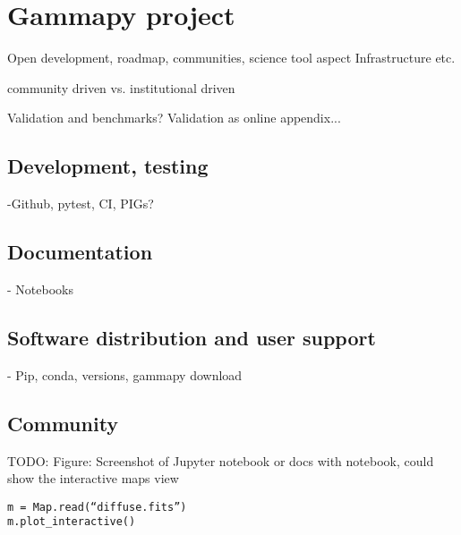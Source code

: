 \section{Gammapy project}
\label{sec:project}

Open development, roadmap, communities,
science tool aspect
Infrastructure etc.

community driven vs. institutional driven

Validation and benchmarks?
Validation as online appendix...

\subsection{Development, testing}

-Github, pytest, CI, PIGs?

\subsection{Documentation}

- Notebooks

\subsection{Software distribution and user support}

- Pip, conda, versions, gammapy download

\subsection{Community}

TODO: Figure: Screenshot of Jupyter notebook or docs with notebook, could show the interactive maps view
\begin{verbatim}
m = Map.read(“diffuse.fits”)
m.plot_interactive()        
\end{verbatim}
